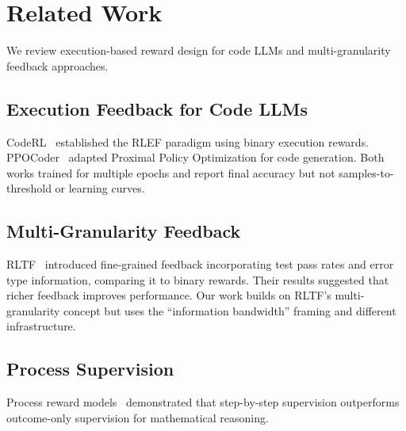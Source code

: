 \section{Related Work}
\label{sec:related_work}

We review execution-based reward design for code LLMs and multi-granularity feedback approaches.

\subsection{Execution Feedback for Code LLMs}

CodeRL~\cite{le2022coderl} established the RLEF paradigm using binary execution rewards. PPOCoder~\cite{shojaee2023ppocoder} adapted Proximal Policy Optimization for code generation. Both works trained for multiple epochs and report final accuracy but not samples-to-threshold or learning curves.

\subsection{Multi-Granularity Feedback}

RLTF~\cite{liu2023rltf} introduced fine-grained feedback incorporating test pass rates and error type information, comparing it to binary rewards. Their results suggested that richer feedback improves performance. Our work builds on RLTF's multi-granularity concept but uses the ``information bandwidth'' framing and different infrastructure.

\subsection{Process Supervision}

Process reward models~\cite{lightman2023verify} demonstrated that step-by-step supervision outperforms outcome-only supervision for mathematical reasoning.
